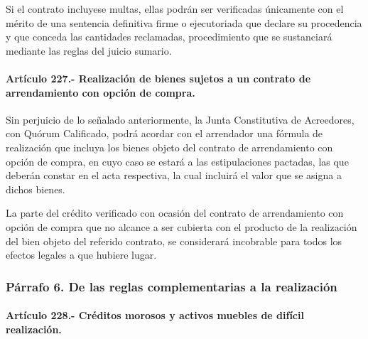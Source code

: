 \documentclass[
]{book}
\begin{document}
Si el contrato incluyese multas, ellas podrán ser verificadas únicamente con el mérito de una sentencia definitiva firme o ejecutoriada que declare su procedencia y que conceda las cantidades reclamadas, procedimiento que se sustanciará mediante las reglas del juicio sumario.

\hypertarget{artuxedculo-227.--realizaciuxf3n-de-bienes-sujetos-a-un-contrato-de-arrendamiento-con-opciuxf3n-de-compra.}{%
\paragraph*{Artículo 227.- Realización de bienes sujetos a un contrato de arrendamiento con opción de compra.}\label{artuxedculo-227.--realizaciuxf3n-de-bienes-sujetos-a-un-contrato-de-arrendamiento-con-opciuxf3n-de-compra.}}

Sin perjuicio de lo señalado anteriormente, la Junta Constitutiva de Acreedores, con Quórum Calificado, podrá acordar con el arrendador una fórmula de realización que incluya los bienes objeto del contrato de arrendamiento con opción de compra, en cuyo caso se estará a las estipulaciones pactadas, las que deberán constar en el acta respectiva, la cual incluirá el valor que se asigna a dichos bienes.

La parte del crédito verificado con ocasión del contrato de arrendamiento con opción de compra que no alcance a ser cubierta con el producto de la realización del bien objeto del referido contrato, se considerará incobrable para todos los efectos legales a que hubiere lugar.

\hypertarget{puxe1rrafo-6.-de-las-reglas-complementarias-a-la-realizaciuxf3n}{%
\subsubsection*{Párrafo 6. De las reglas complementarias a la realización}\label{puxe1rrafo-6.-de-las-reglas-complementarias-a-la-realizaciuxf3n}}

\hypertarget{artuxedculo-228.--cruxe9ditos-morosos-y-activos-muebles-de-difuxedcil-realizaciuxf3n.}{%
\paragraph*{Artículo 228.- Créditos morosos y activos muebles de difícil realización.}\label{artuxedculo-228.--cruxe9ditos-morosos-y-activos-muebles-de-difuxedcil-realizaciuxf3n.}}
\end{document}
